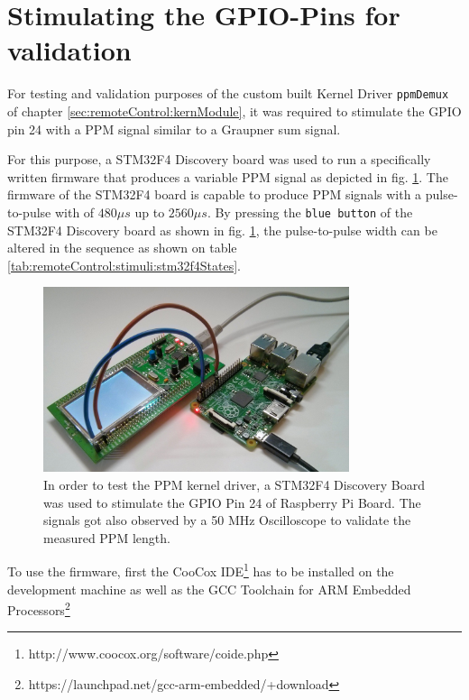 \section{Stimulating the GPIO-Pins for validation}
\label{sec:remoteControl:stimuli}

For testing and validation purposes of the custom built Kernel Driver \texttt{ppmDemux} of chapter \ref{sec:remoteControl:kernModule}, it was required to stimulate the GPIO pin 24 with a PPM signal similar to a Graupner sum signal.

For this purpose, a STM32F4 Discovery board was used to run a specifically written firmware that produces a variable PPM signal as depicted in fig. \ref{fig:remoteControl:stimuli:hwSetup}. The firmware of the STM32F4 board is capable to produce PPM signals with a pulse-to-pulse with of $480\mu s$ up to $2560\mu s$. By pressing the \texttt{blue button} of the STM32F4 Discovery board as shown in fig. \ref{fig:remoteControl:stimuli:hwSetup}, the pulse-to-pulse width can be altered in the sequence as shown on table \ref{tab:remoteControl:stimuli:stm32f4States}.

\begin{figure}[H]
    \centering
    \includegraphics[width=0.80\textwidth]{fig/ch-ppm-kernel-driver/picStimulusRpi}
    \caption[Stimulating GPIO Pins of Raspberry Pi]{In order to test the PPM kernel driver, a STM32F4 Discovery Board was used to stimulate the GPIO Pin 24 of Raspberry Pi Board. The signals got also observed by a 50 MHz Oscilloscope to validate the measured PPM length.}
    \label{fig:remoteControl:stimuli:hwSetup}
\end{figure}

To use the firmware, first the CooCox IDE\footnote{http://www.coocox.org/software/coide.php} has to be installed on the development machine as well as the GCC Toolchain for ARM Embedded Processors\footnote{https://launchpad.net/gcc-arm-embedded/+download}

